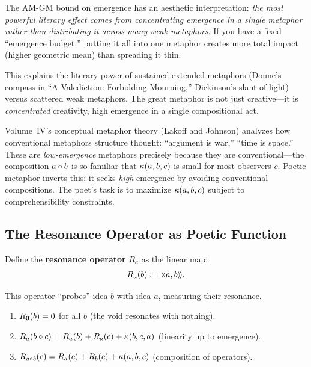 \begin{interpretation}
The AM-GM bound on emergence has an aesthetic interpretation: \emph{the most
powerful literary effect comes from concentrating emergence in a single metaphor
rather than distributing it across many weak metaphors}. If you have a fixed
``emergence budget,'' putting it all into one metaphor creates more total impact
(higher geometric mean) than spreading it thin.

This explains the literary power of sustained extended metaphors (Donne's compass
in ``A Valediction: Forbidding Mourning,'' Dickinson's slant of light) versus
scattered weak metaphors. The great metaphor is not just creative---it is
\emph{concentrated} creativity, high emergence in a single compositional act.

Volume~IV's conceptual metaphor theory (Lakoff and Johnson) analyzes how
conventional metaphors structure thought: ``argument is war,'' ``time is space.''
These are \emph{low-emergence} metaphors precisely because they are conventional---the
composition $a \circ b$ is so familiar that $\kappa(a, b, c)$ is small for
most observers $c$. Poetic metaphor inverts this: it seeks \emph{high} emergence
by avoiding conventional compositions. The poet's task is to maximize
$\kappa(a, b, c)$ subject to comprehensibility constraints.
\end{interpretation}

\subsection{The Resonance Operator as Poetic Function}

Define the \textbf{resonance operator} $R_a$ as the linear map:
\[
  R_a(b) := \langle\!\langle a, b \rangle\!\rangle.
\]

This operator ``probes'' idea $b$ with idea $a$, measuring their resonance.

\begin{theorem}
\label{thm:resonance-operator-properties}
\begin{enumerate}
  \item $R_{\mathbf{0}}(b) = 0$ for all $b$ (the void resonates with nothing).
  \item $R_{a}(b \circ c) = R_a(b) + R_a(c) + \kappa(b, c, a)$ (linearity up to emergence).
  \item $R_{a \circ b}(c) = R_a(c) + R_b(c) + \kappa(a, b, c)$ (composition of operators).
\end{enumerate}
\end{theorem}

